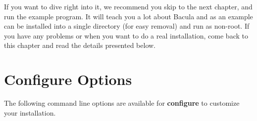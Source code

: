 If you want to dive right into it, we recommend you skip to the next chapter,
and run the example program. It will teach you a lot about Bacula and as an
example can be installed into a single directory (for easy removal) and run as
non-root. If you have any problems or when you want to do a real installation,
come back to this chapter and read the details presented below. 

\section{Configure Options}
\label{Options}

The following command line options are available for {\bf configure} to
customize your installation. 

